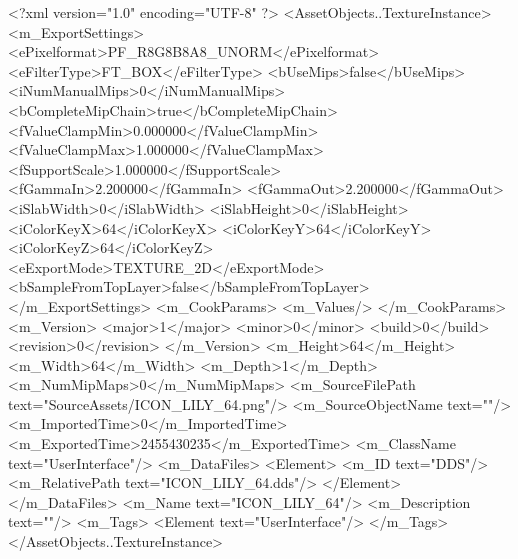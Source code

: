 <?xml version="1.0" encoding="UTF-8" ?>
<AssetObjects..TextureInstance>
	<m_ExportSettings>
		<ePixelformat>PF_R8G8B8A8_UNORM</ePixelformat>
		<eFilterType>FT_BOX</eFilterType>
		<bUseMips>false</bUseMips>
		<iNumManualMips>0</iNumManualMips>
		<bCompleteMipChain>true</bCompleteMipChain>
		<fValueClampMin>0.000000</fValueClampMin>
		<fValueClampMax>1.000000</fValueClampMax>
		<fSupportScale>1.000000</fSupportScale>
		<fGammaIn>2.200000</fGammaIn>
		<fGammaOut>2.200000</fGammaOut>
		<iSlabWidth>0</iSlabWidth>
		<iSlabHeight>0</iSlabHeight>
		<iColorKeyX>64</iColorKeyX>
		<iColorKeyY>64</iColorKeyY>
		<iColorKeyZ>64</iColorKeyZ>
		<eExportMode>TEXTURE_2D</eExportMode>
		<bSampleFromTopLayer>false</bSampleFromTopLayer>
	</m_ExportSettings>
	<m_CookParams>
		<m_Values/>
	</m_CookParams>
	<m_Version>
		<major>1</major>
		<minor>0</minor>
		<build>0</build>
		<revision>0</revision>
	</m_Version>
	<m_Height>64</m_Height>
	<m_Width>64</m_Width>
	<m_Depth>1</m_Depth>
	<m_NumMipMaps>0</m_NumMipMaps>
	<m_SourceFilePath text="SourceAssets/ICON_LILY_64.png"/>
	<m_SourceObjectName text=""/>
	<m_ImportedTime>0</m_ImportedTime>
	<m_ExportedTime>2455430235</m_ExportedTime>
	<m_ClassName text="UserInterface"/>
	<m_DataFiles>
		<Element>
			<m_ID text="DDS"/>
			<m_RelativePath text="ICON_LILY_64.dds"/>
		</Element>
	</m_DataFiles>
	<m_Name text="ICON_LILY_64"/>
	<m_Description text=""/>
	<m_Tags>
		<Element text="UserInterface"/>
	</m_Tags>
</AssetObjects..TextureInstance>

